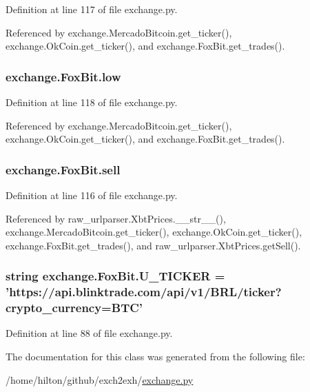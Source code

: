 Definition at line 117 of file exchange.\-py.



Referenced by exchange.\-Mercado\-Bitcoin.\-get\-\_\-ticker(), exchange.\-Ok\-Coin.\-get\-\_\-ticker(), and exchange.\-Fox\-Bit.\-get\-\_\-trades().

\hypertarget{classexchange_1_1_fox_bit_acd666444cff98fe477651120ddb0f915}{
\subsubsection[{low}]{\setlength{\rightskip}{0pt plus 5cm}exchange.\-Fox\-Bit.\-low}}\label{classexchange_1_1_fox_bit_acd666444cff98fe477651120ddb0f915}


Definition at line 118 of file exchange.\-py.



Referenced by exchange.\-Mercado\-Bitcoin.\-get\-\_\-ticker(), exchange.\-Ok\-Coin.\-get\-\_\-ticker(), and exchange.\-Fox\-Bit.\-get\-\_\-trades().

\hypertarget{classexchange_1_1_fox_bit_ac1fae4ef7a43254b71d7173a5cc6eeaf}{
\subsubsection[{sell}]{\setlength{\rightskip}{0pt plus 5cm}exchange.\-Fox\-Bit.\-sell}}\label{classexchange_1_1_fox_bit_ac1fae4ef7a43254b71d7173a5cc6eeaf}


Definition at line 116 of file exchange.\-py.



Referenced by raw\-\_\-urlparser.\-Xbt\-Prices.\-\_\-\-\_\-str\-\_\-\-\_\-(), exchange.\-Mercado\-Bitcoin.\-get\-\_\-ticker(), exchange.\-Ok\-Coin.\-get\-\_\-ticker(), exchange.\-Fox\-Bit.\-get\-\_\-trades(), and raw\-\_\-urlparser.\-Xbt\-Prices.\-get\-Sell().

\hypertarget{classexchange_1_1_fox_bit_a7ba3f64a2b55479da2239393c6140ec8}{
\subsubsection[{U\-\_\-\-T\-I\-C\-K\-E\-R}]{\setlength{\rightskip}{0pt plus 5cm}string exchange.\-Fox\-Bit.\-U\-\_\-\-T\-I\-C\-K\-E\-R = 'https\-://api.\-blinktrade.\-com/api/v1/B\-R\-L/{\bf ticker}?crypto\-\_\-currency=B\-T\-C'\hspace{0.3cm}{\ttfamily [static]}}}\label{classexchange_1_1_fox_bit_a7ba3f64a2b55479da2239393c6140ec8}


Definition at line 88 of file exchange.\-py.



The documentation for this class was generated from the following file\-:\begin{DoxyCompactItemize}
\item 
/home/hilton/github/exch2exh/\hyperlink{exchange_8py}{exchange.\-py}\end{DoxyCompactItemize}
